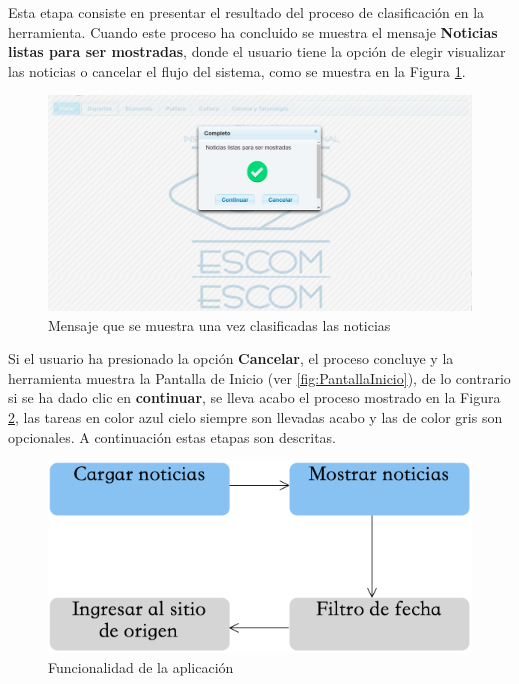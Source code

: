 Esta etapa consiste en presentar el resultado del proceso de clasificación en la herramienta. Cuando este proceso ha concluido se muestra el mensaje \textbf{Noticias listas para ser mostradas}, donde el usuario tiene la opción de elegir visualizar las noticias o cancelar el flujo del sistema, como se muestra en la Figura \ref{fig:notClass}.

\begin{figure}[H]
\centering
\includegraphics[scale=0.29]{imagenes/Capitulo5/noticiasListasParaSerMostradas.png}
\caption{Mensaje que se muestra una vez clasificadas las noticias}
\label{fig:notClass}
\end{figure}

Si el usuario ha presionado la opción \textbf{Cancelar}, el proceso concluye y la herramienta muestra la Pantalla de Inicio (ver \ref{fig:PantallaInicio}), de lo contrario si se ha dado clic en \textbf{continuar}, se lleva acabo el proceso mostrado en la Figura \ref{fig:cp5:mostrar}, las tareas en color azul cielo siempre son llevadas acabo y las de color gris son opcionales. A continuación estas etapas son descritas.

\begin{figure}[H]
\centering
\includegraphics[scale=0.55]{imagenes/Capitulo5/AplicacionWeb/MostrarDatosApp.png}
\caption{Funcionalidad de la aplicación}
\label{fig:cp5:mostrar}
\end{figure}


